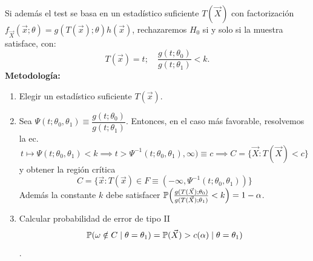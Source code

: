 \begin{corolario}[6]
Si además el test se basa en un estadístico suficiente $T(\vec{X})$ con factorización $f_{\vec{X}}(\vec{x};\theta) = g(T(\vec{x});\theta)h(\vec{x})$, rechazaremos $H_0$ si y solo si la muestra satisface, con:
\[
  T(\vec{x}) = t; \quad \frac{g(t; \theta_0)}{g(t; \theta_1)} < k.
\]
\textbf{Metodología:}
\begin{enumerate}
  \item Elegir un estadístico suficiente $T(\vec{x})$.
  \item Sea $\Psi(t; \theta_0, \theta_1) \equiv \dfrac{g(t; \theta_0)}{g(t; \theta_1)}$. Entonces, en el caso más favorable, resolvemos la ec.
  \[
    t \mapsto \Psi(t; \theta_0, \theta_1) < k \implies t > \Psi^{-1}(t; \theta_0, \theta_1), \infty) \equiv c \implies C = \{\vec{X} : T(\vec{X}) < c\}
  \]
  y obtener la región crítica
  \[
    C = \{\vec{x} : T(\vec{x}) \in F \equiv (-\infty, \Psi^{-1}(t; \theta_0, \theta_1))\}
  \]
  Además la constante $k$ debe satisfacer $\mathbb{P}\!\left(\frac{g(T(\vec{X}); \theta_0)}{g(T(\vec{X}); \theta_1)} < k\right) = 1 - \alpha$.

  \item Calcular probabilidad de error de tipo II
  \[
    \mathbb{P}(\omega \notin C \mid \theta = \theta_1) = \mathbb{P}(\vec{X}) > c(\alpha) \mid \theta = \theta_1)
  \].
\end{enumerate}
\end{corolario}
